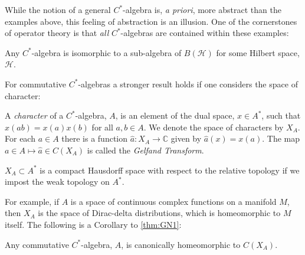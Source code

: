 \documentclass[final,leqno]{siamart}
\begin{document}
While the notion of a general $C^{*}$-algebra is, \textit{a priori}, more abstract than the examples above, this feeling of abstraction is an illusion.
One of the cornerstones of operator theory is that \emph{all} $C^{*}$-algebras are contained within these examples:

\begin{theorem} \label{thm:GN1}
	Any $C^{*}$-algebra is isomorphic to a sub-algebra of $B(\mathcal{H})$ for some Hilbert space, $\mathcal{H}$.
\end{theorem}

For commutative $C^{*}$-algebras a stronger result holds if one considers the space of character:
\begin{definition}
	A \emph{character} of a $C^{*}$-algebra, $A$, is an element of the dual space, $x \in A^{*}$, such that $x(ab) = x(a) x(b)$ for all $a,b \in A$.  
	We denote the space of characters by $X_{A}$.
	For each $a \in A$ there is a function $\hat{a}: X_{A} \to \mathbb{C}$ given by $\hat{a}(x) = x(a)$.
	The map $a \in A \mapsto \hat{a} \in C(X_{A})$ is called the \emph{Gelfand Transform}.
\end{definition}

\begin{proposition}
	$X_{A} \subset A^{*}$ is a compact Hausdorff space with respect to the relative topology if we impost the weak topology on $A^{*}$.
\end{proposition}

For example, if $A$ is a space of continuous complex functions on a manifold $M$, then $X_{A}$ is the space of Dirac-delta distributions, which is homeomorphic to $M$ itself.
The following is a Corollary to \ref{thm:GN1}:

\begin{theorem} \label{thm:GN2}
	Any commutative $C^{*}$-algebra, $A$, is canonically homeomorphic to $C(X_{A} )$.
\end{theorem}
\end{document}
